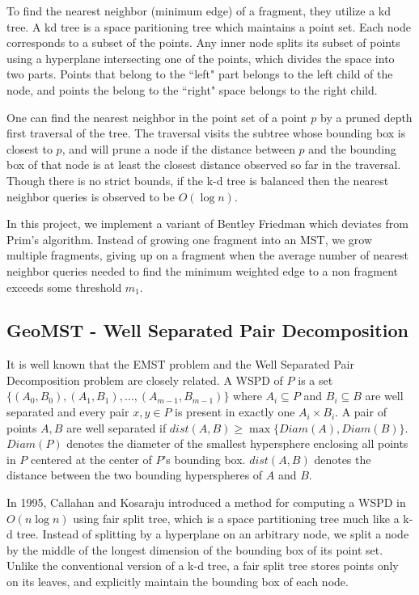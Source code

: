 \documentclass[11pt]{article}
\begin{document}
To find the nearest neighbor (minimum edge) of a fragment, they utilize a kd tree. A kd tree is a space paritioning tree which maintains a point set. Each node corresponds to a subset of the points. Any inner node splits its subset of points using a hyperplane intersecting one of the points, which divides the space into two parts. Points that belong to the ``left" part belongs to the left child of the node, and points the belong to the ``right" space belongs to the right child.

One can find the nearest neighbor in the point set of a point $p$ by a pruned depth first traversal of the tree. The traversal visits the subtree whose bounding box is closest to $p$, and will prune a node if the distance between $p$ and the bounding box of that node is at least the closest distance observed so far in the traversal. Though there is no strict bounds, if the k-d tree is balanced then the nearest neighbor queries is observed to be $O(\log{n})$.

In this project, we implement a variant of Bentley Friedman which deviates from Prim's algorithm. Instead of growing one fragment into an MST, we grow multiple fragments, giving up on a fragment when the average number of nearest neighbor queries needed to find the minimum weighted edge to a non fragment exceeds some threshold $m_1$.

\subsection{GeoMST - Well Separated Pair Decomposition}

It is well known that the EMST problem and the Well Separated Pair Decomposition problem are closely related. A WSPD of $P$ is a set $\{(A_0, B_0), (A_1, B_1), \ldots, (A_{m-1}, B_{m-1})\}$ where $A_i \subseteq P$ and $B_i \subseteq B$ are well separated and every pair $x,y \in P$ is present in exactly one $A_i \times B_i$. A pair of points $A,B$ are well separated if $dist(A, B) \ge \max\{Diam(A), Diam(B)\}$. $Diam(P)$ denotes the diameter of the smallest hypersphere enclosing all points in $P$ centered at the center of $P$'s bounding box. $dist(A,B)$ denotes the distance between the two bounding hyperspheres of $A$ and $B$. 

In 1995, Callahan and Kosaraju introduced a method for computing a WSPD in $O(n\log{n})$ using fair split tree, which is a space partitioning tree much like a k-d tree.\cite{Callahan} Instead of splitting by a hyperplane on an arbitrary node, we split a node by the middle of the longest dimension of the bounding box of its point set. Unlike the conventional version of a k-d tree, a fair split tree stores points only on its leaves, and explicitly maintain the bounding box of each node.
\end{document}

